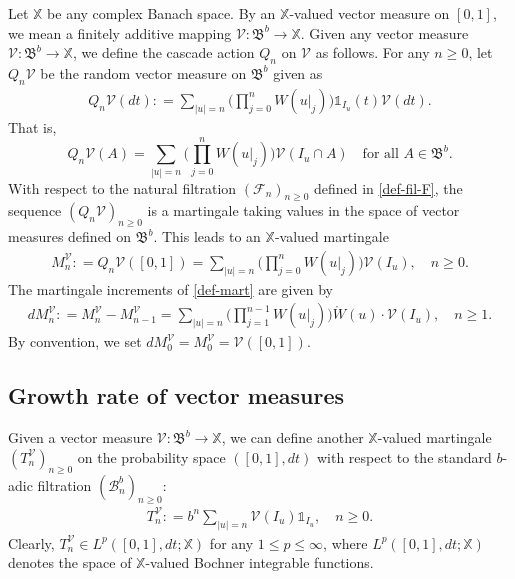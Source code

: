 \documentclass[12pt]{amsart}
\theoremstyle{definition}
\theoremstyle{remark}
\newcommand{\fX}{\mathbb{X}}
\newcommand{\indi}{\mathds{1}}
\numberwithin{equation}{section}
\begin{document}
Let  $\fX$ be any complex Banach space. By an $\fX$-valued  vector measure on $[0,1]$, we  mean a   finitely additive mapping  $\mathcal{V}: \mathfrak{B}^b \rightarrow \fX$.   
Given any vector measure $\mathcal{V}: \mathfrak{B}^b \rightarrow \fX$, we define the cascade action $Q_n$ on $\mathcal{V}$ as follows. For any $n\ge 0$, let $Q_n \mathcal{V}$ be  the random vector measure  on $\mathfrak{B}^b$ given as
\begin{align}\label{def-ran-vec}
Q_n\mathcal{V} (dt):  =   \sum_{|u|=n} \Big(\prod_{j=0}^n W(u|_j) \Big) \indi_{I_u} (t)\mathcal{V}(dt). 
\end{align}
That is, 
\[
Q_n\mathcal{V} (A)=    \sum_{|u|=n} \Big(\prod_{j=0}^n W(u|_j) \Big)  \mathcal{V}  (I_u \cap A) \quad \text{for all $A\in \mathfrak{B}^b$}.  
\]
With respect to the natural filtration $(\mathscr{F}_n)_{n\ge 0}$ defined in \eqref{def-fil-F},  the sequence  $(Q_n\mathcal{V})_{n\ge 0}$ is a martingale taking values in the space of vector measures defined on $\mathfrak{B}^b$.  This leads to an $\fX$-valued martingale 
\begin{align}\label{def-mart}
M_n^{\mathcal{V}} : = Q_n\mathcal{V}([0,1] )=  \sum_{|u|=n} \Big(\prod_{j=0}^n W(u|_j) \Big) \mathcal{V}(I_u), \quad n\ge 0.
\end{align}
The martingale increments of  \eqref{def-mart}  are given by 
\begin{align}\label{def-dM}
dM_n^\mathcal{V}: = M_n^\mathcal{V}- M_{n-1}^\mathcal{V}=  \sum_{|u|=n}  \Big(\prod_{j=1}^{n-1} W(u|_j)\Big) \mathring{W}(u) \cdot \mathcal{V}(I_u), \quad n\ge 1. 
\end{align}
By convention, we set 
$
dM_0^\mathcal{V}  =  M_0^\mathcal{V} = \mathcal{V}([0,1]). 
$






\subsection{Growth rate of vector measures}\label{sec-vm}
Given a vector measure  $\mathcal{V}: \mathfrak{B}^b \rightarrow \fX$,   we  can define another  $\fX$-valued martingale  $(T^\mathcal{V}_n)_{n\ge 0}$ on the probability space $([0,1], dt)$ with respect to the  standard $b$-adic filtration   $(\mathscr{B}_n^b)_{n\ge 0}$: 
\begin{align}\label{def-H-mart}
T^\mathcal{V}_n :  = b^n \sum_{|u|=n} \mathcal{V}(I_u) \indi_{I_u}, \quad n\ge 0. 
\end{align}
Clearly, $T^\mathcal{V}_n \in L^p([0,1], dt; \fX)$ for any $1\le p\le \infty$, where $L^p([0,1], dt; \fX)$  denotes the space of $\fX$-valued Bochner integrable functions.  
\end{document}
